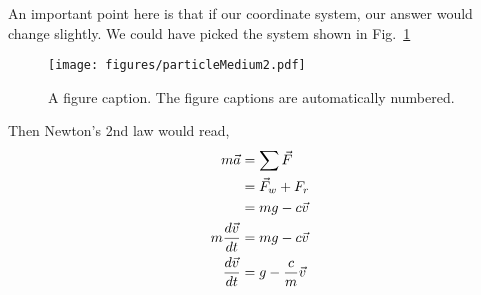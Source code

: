 \begin{enumerate}[label = \bfseries (\alph*)]
An important point here is that if our coordinate system, our answer would change slightly. We could have picked the system shown in Fig.~\ref{2015:q5:fig:particle2}
\begin{figure}
\begin{center}
\texttt{[image: figures/particleMedium2.pdf]}
\caption{\label{2015:q5:fig:particle2} A figure caption. The figure captions are
automatically numbered.}
\end{center}
\end{figure}
Then Newton's 2nd law would read,
\begin{align}
   m \vec{a} &= \sum \vec{F} \nonumber\\
   &= \vec{F}_w + F_r \nonumber \\
   &= m g - c \vec{v} \nonumber \\
   m \frac{d\vec{v}}{dt} &= mg - c \vec{v} \nonumber \\
   \frac{d\vec{v}}{dt} &= g - \frac{c}{m} \vec{v} 
\end{align}


\end{enumerate}

